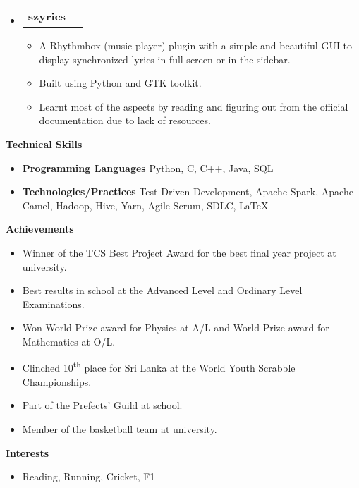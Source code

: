 \documentclass[letterpaper,12pt]{article}[leftmargin=*]
\makeatletter
\def \entryspacing {-0pt}
\renewcommand{\section}[2]{\vspace{5pt}
  \colorbox{secondary}{\color{white}\raggedbottom\normalsize\textbf{{#1}{\hspace{7pt}#2}}}
}
\newcommand{\resumeEntryStart}{\begin{itemize}[leftmargin=2.5mm]}
\newcommand{\resumeEntryEnd}{\end{itemize}\vspace{\entryspacing}}
\newcommand{\resumeItemListStart}{\begin{itemize}[leftmargin=4.5mm]}
\newcommand{\resumeItemListEnd}{\end{itemize}}
\newcommand{\resumeItem}[1]{
  \item\small{
    {#1 \vspace{-2pt}}
  }
}
\newcommand{\resumeEntryTD}[2]{
  \vspace{-1pt}\item[]
    \begin{tabularx}{0.97\textwidth}{X@{\hspace{60pt}}r}
      \textbf{\color{primary}#1} & {\firabook\color{accent}\small#2} \\
    \end{tabularx}\vspace{-6pt}
}
\newcommand{\resumeEntryS}[2]{
  \item[]\small{
    \textbf{\color{primary}#1 }{ #2 \vspace{-6pt}}
  }
}
\makeatother
\begin{document}
  \resumeEntryStart
    \resumeEntryTD
      {szyrics}{}
    \resumeItemListStart
      \resumeItem {A Rhythmbox (music player) plugin with a simple and beautiful GUI to display synchronized lyrics in full screen or in the sidebar.}
      \resumeItem {Built using Python and GTK toolkit.}
      \resumeItem {Learnt most of the aspects by reading and figuring out from the official documentation due to lack of resources.}
    \resumeItemListEnd
  \resumeEntryEnd

\section{\faStar}{Technical Skills}
 \resumeEntryStart
  \resumeEntryS{Programming Languages} {Python, C, C++, Java, SQL}
  \resumeEntryS{Technologies/Practices} {Test-Driven Development, Apache Spark, Apache Camel, Hadoop, Hive, Yarn, Agile Scrum, SDLC, \LaTeX}
 \resumeEntryEnd
 
\section{\faTrophy}{Achievements}
  \resumeEntryStart
      \resumeItem {Winner of the TCS Best Project Award for the best final year project at university.}
      \resumeItem {Best results in school at the Advanced Level and Ordinary Level Examinations.}
      \resumeItem {Won World Prize award for Physics at A/L and World Prize award for Mathematics at O/L.}
      \resumeItem {Clinched 10\textsuperscript{th} place for Sri Lanka at the World Youth Scrabble Championships.}
      \resumeItem {Part of the Prefects' Guild at school.}
      \resumeItem {Member of the basketball team at university.}
 \resumeEntryEnd

\section{\faHeart}{Interests}
  \resumeEntryStart
      \resumeEntryS {}{Reading, Running, Cricket, F1}
   \resumeEntryEnd
\end{document}
